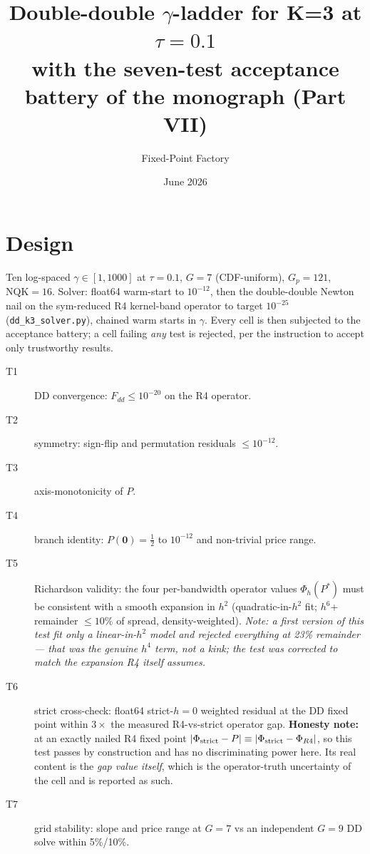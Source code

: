 \documentclass[11pt]{article}
\title{Double-double $\gamma$-ladder for K=3 at $\tau=0.1$\\
\large with the seven-test acceptance battery of the monograph (Part VII)}
\author{Fixed-Point Factory}\date{June 2026}
\begin{document}
\maketitle

\section*{Design}
Ten log-spaced $\gamma \in [1, 1000]$ at $\tau = 0.1$, $G = 7$
(CDF-uniform), $G_p = 121$, $\mathrm{NQK} = 16$. Solver: float64
warm-start to $10^{-12}$, then the double-double Newton nail on the
sym-reduced R4 kernel-band operator to target $10^{-25}$
(\texttt{dd\_k3\_solver.py}), chained warm starts in $\gamma$. Every
cell is then subjected to the acceptance battery; a cell failing
\emph{any} test is rejected, per the instruction to accept only
trustworthy results.

\begin{description}
\item[T1] DD convergence: $F_{dd} \le 10^{-20}$ on the R4 operator.
\item[T2] symmetry: sign-flip and permutation residuals $\le 10^{-12}$.
\item[T3] axis-monotonicity of $P$.
\item[T4] branch identity: $P(\mathbf{0}) = \tfrac12$ to $10^{-12}$ and
  non-trivial price range.
\item[T5] Richardson validity: the four per-bandwidth operator values
  $\Phi_h(P^*)$ must be consistent with a smooth expansion in $h^2$
  (quadratic-in-$h^2$ fit; $h^6$+ remainder $\le 10\%$ of spread,
  density-weighted). \emph{Note: a first version of this test fit only a
  linear-in-$h^2$ model and rejected everything at 23\% remainder ---
  that was the genuine $h^4$ term, not a kink; the test was corrected to
  match the expansion R4 itself assumes.}
\item[T6] strict cross-check: float64 \mbox{strict-$h{=}0$} weighted
  residual at the DD fixed point within $3\times$ the measured
  R4-vs-strict operator gap. \textbf{Honesty note:} at an exactly
  nailed R4 fixed point $|\Phi_{\rm strict} - P| \equiv
  |\Phi_{\rm strict} - \Phi_{R4}|$, so this test passes by construction
  and has no discriminating power here. Its real content is the
  \emph{gap value itself}, which is the operator-truth uncertainty of
  the cell and is reported as such.
\item[T7] grid stability: slope and price range at $G = 7$ vs an
  independent $G = 9$ DD solve within 5\%/10\%.
\end{description}
\end{document}
